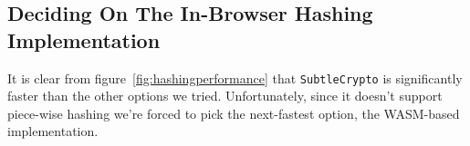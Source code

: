 \subsection{Deciding On The In-Browser Hashing Implementation}
\label{subsec:deciding-on-the-in-browser-hashing-implementation}
It is clear from figure~\ref{fig:hashingperformance} that \texttt{SubtleCrypto} is significantly faster than the other options we tried.
Unfortunately, since it doesn't support piece-wise hashing we're forced to pick the next-fastest option, the \gls{WASM}-based implementation.













